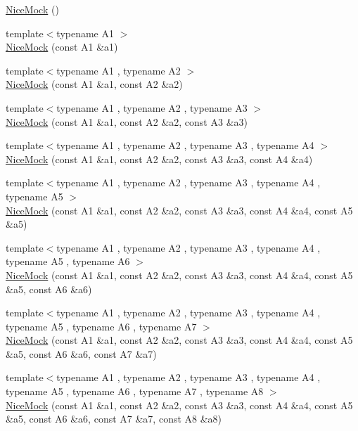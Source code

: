 \begin{DoxyCompactItemize}
\mbox{\hyperlink{classtesting_1_1_nice_mock_a10bbd6ebe779ac8ab1f9f3ae2dee9310}{Nice\+Mock}} ()
\item 
{\footnotesize template$<$typename A1 $>$ }\\\mbox{\hyperlink{classtesting_1_1_nice_mock_a2d6b9cb9d929d1af4532b69c7ef19df6}{Nice\+Mock}} (const A1 \&a1)
\item 
{\footnotesize template$<$typename A1 , typename A2 $>$ }\\\mbox{\hyperlink{classtesting_1_1_nice_mock_a150837476e88f52772c8f85180b889a1}{Nice\+Mock}} (const A1 \&a1, const A2 \&a2)
\item 
{\footnotesize template$<$typename A1 , typename A2 , typename A3 $>$ }\\\mbox{\hyperlink{classtesting_1_1_nice_mock_a0b91bd74b497626bb81d07c3d4b59d22}{Nice\+Mock}} (const A1 \&a1, const A2 \&a2, const A3 \&a3)
\item 
{\footnotesize template$<$typename A1 , typename A2 , typename A3 , typename A4 $>$ }\\\mbox{\hyperlink{classtesting_1_1_nice_mock_a5ffbe1a648f16612266d4e67a2d063d1}{Nice\+Mock}} (const A1 \&a1, const A2 \&a2, const A3 \&a3, const A4 \&a4)
\item 
{\footnotesize template$<$typename A1 , typename A2 , typename A3 , typename A4 , typename A5 $>$ }\\\mbox{\hyperlink{classtesting_1_1_nice_mock_a3812c0ba0d743f9a0c3d276dfc076f4c}{Nice\+Mock}} (const A1 \&a1, const A2 \&a2, const A3 \&a3, const A4 \&a4, const A5 \&a5)
\item 
{\footnotesize template$<$typename A1 , typename A2 , typename A3 , typename A4 , typename A5 , typename A6 $>$ }\\\mbox{\hyperlink{classtesting_1_1_nice_mock_a156d0fce85ac08abffdf4aa0c3975f81}{Nice\+Mock}} (const A1 \&a1, const A2 \&a2, const A3 \&a3, const A4 \&a4, const A5 \&a5, const A6 \&a6)
\item 
{\footnotesize template$<$typename A1 , typename A2 , typename A3 , typename A4 , typename A5 , typename A6 , typename A7 $>$ }\\\mbox{\hyperlink{classtesting_1_1_nice_mock_a946d75ece1fa3a066b7d9d6ab7828c55}{Nice\+Mock}} (const A1 \&a1, const A2 \&a2, const A3 \&a3, const A4 \&a4, const A5 \&a5, const A6 \&a6, const A7 \&a7)
\item 
{\footnotesize template$<$typename A1 , typename A2 , typename A3 , typename A4 , typename A5 , typename A6 , typename A7 , typename A8 $>$ }\\\mbox{\hyperlink{classtesting_1_1_nice_mock_ae8792aab6c024a50886856bf1093eedc}{Nice\+Mock}} (const A1 \&a1, const A2 \&a2, const A3 \&a3, const A4 \&a4, const A5 \&a5, const A6 \&a6, const A7 \&a7, const A8 \&a8)

\end{DoxyCompactItemize}

